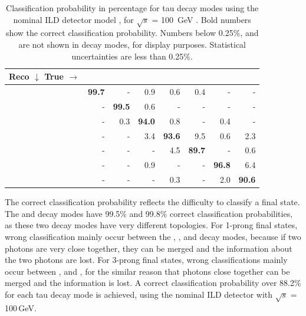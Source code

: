 \documentclass[a4paper,11pt]{article}
\newcommand{\decayElectronShort}{\Pem\PAGne}
\newcommand{\decayMuonShort}{\PGmm\PAGnGm}
\newcommand{\decayPionShort}{\PGpm}
\newcommand{\decayRhoShort}{\PGrP{\PGpm\PGpz}}
\newcommand{\decayAiPhotonShort}{\PaDoP{\PGpm\PGpz\PGpz}}
\newcommand{\decayAiPionShort}{\PaDoP{\PGpm\PGpm\PGpp}}
\newcommand{\decayThreePionPhotonShort}{\PGpm\PGpm\PGpp\PGpz}
\newcommand{\rootS}{\ensuremath{\sqrt{s}} }
\begin{document}
\begin{table}[htbp]
\centering

\smallskip
\small
\begin{tabular}{| l | r | r | r | r | r | r | r |}
\hline
  \textbf{Reco $\downarrow$ True $\to$}  & \textbf{\decayElectronShort} & \textbf{\decayMuonShort} &\textbf{\decayPionShort} & \textbf{\decayRhoShort} &\textbf{\decayAiPhotonShort} &\textbf{\decayAiPionShort} &\textbf{\decayThreePionPhotonShort} \\
\hline

\textbf{\decayElectronShort}&\textbf{99.7}&-&0.9&0.6&0.4&-&-\\
\textbf{\decayMuonShort}&-&\textbf{99.5}&0.6&-&-&-&-\\
\textbf{\decayPionShort}&-&0.3&\textbf{94.0}&0.8&-&0.4&-\\
\textbf{\decayRhoShort}&-&-&3.4&\textbf{93.6}&9.5&0.6&2.3\\
\textbf{\decayAiPhotonShort}&-&-&-&4.5&\textbf{89.7}&-&0.6\\
\textbf{\decayAiPionShort}&-&-&0.9&-&-&\textbf{96.8}&6.4\\
\textbf{\decayThreePionPhotonShort}&-&-&-&0.3&-&2.0&\textbf{90.6}\\


\hline
\end{tabular}
\caption{\label{tab:sel_example} Classification probability in percentage for tau decay modes using the nominal ILD detector model , for \rootS = 100 \,GeV . Bold numbers show the correct classification probability. Numbers below 0.25\%, and \PGnGt are not shown in decay modes, for display purposes. Statistical uncertainties are less than 0.25\%.}
\end{table}

The correct classification probability reflects the difficulty to classify a final state. The \decayMuonShort and \decayElectronShort decay modes have 99.5\% and 99.8\% correct classification probabilities, as these two decay modes have very different topologies. For 1-prong final states, wrong classification mainly occur between the \decayPionShort, \decayRhoShort, and \decayAiPhotonShort decay modes, because if two photons are very close together, they can be merged and the information about the two photons are lost. For 3-prong final states, wrong classifications mainly occur between \decayAiPionShort, and \decayThreePionPhotonShort, for the similar reason that photons close together can be merged and the information is lost. A correct classification probability over 88.2\% for each tau decay mode is achieved, using the nominal ILD detector with \rootS = 100\,GeV. 
\end{document}
